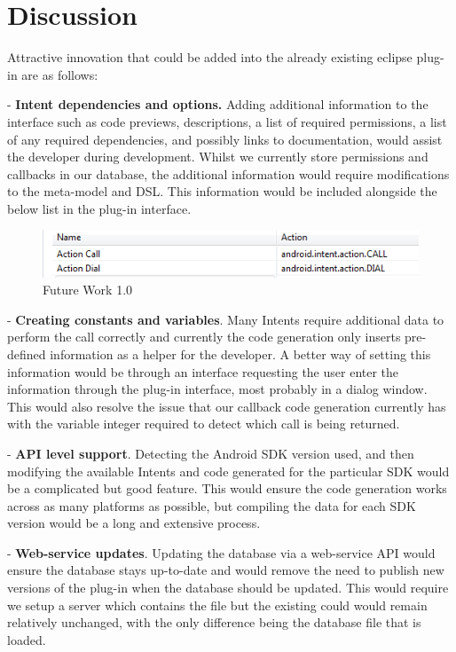 \section{Discussion}
\label{Discussion}

Attractive innovation that could be added into the already existing eclipse plug-in are as follows:

- \textbf{Intent dependencies and options.} Adding additional information to the interface such as code previews, descriptions, a list of required permissions, a list of any required dependencies, and possibly links to documentation, would assist the developer during development. Whilst we currently store permissions and callbacks in our database, the additional information would require modifications to the meta-model and DSL. This information would be included alongside the below list in the plug-in interface.

\begin{figure}[H]
\label{codegeneratorview}
  \centering
    \includegraphics[width=\textwidth]{intentBefore}
  \caption{Future Work 1.0}
\end{figure}

- \textbf{Creating constants and variables}. Many Intents require additional data to perform the call correctly and currently the code generation only inserts pre-defined information as a helper for the developer. A better way of setting this information would be through an interface requesting the user enter the information through the plug-in interface, most probably in a dialog window. This would also resolve the issue that our callback code generation currently has with the variable integer required to detect which call is being returned.

- \textbf{API level support}. Detecting the Android SDK version used, and then modifying the available Intents and code generated for the particular SDK would be a complicated but good feature. This would ensure the code generation works across as many platforms as possible, but compiling the data for each SDK version would be a long and extensive process.

- \textbf{Web-service updates}. Updating the database via a web-service API would ensure the database stays up-to-date and would remove the need to publish new versions of the plug-in when the database should be updated. This would require we setup a server which contains the file but the existing could would remain relatively unchanged, with the only difference being the database file that is loaded.
	